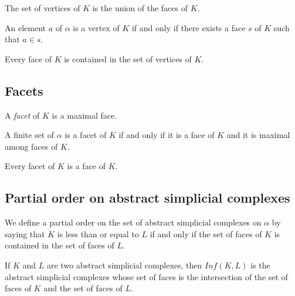 \begin{sublemma}[vertices\_eq]
The set of vertices of $K$ is the union of the faces of $K$.

\end{sublemma}

\begin{sublemma}
An element $a$ of $\alpha$ is a vertex of $K$ if and only if there exists a face $s$ of $K$ such that $a\in s$.

\end{sublemma}

\begin{sublemma}
Every face of $K$ is contained in the set of vertices of $K$.

\end{sublemma}


\subsection{Facets}

\begin{subdefi}[facets]
A \emph{facet} of $K$ is a maximal face.

\end{subdefi}

\begin{sublemma}
A finite set of $\alpha$ is a facet of $K$ if and only if it is a face of $K$ and it is maximal among faces of $K$.

\end{sublemma}

\begin{sublemma}
Every facet of $K$ is a face of $K$.

\end{sublemma}


\subsection{Partial order on abstract simplicial complexes}

\begin{subdefi}
We define a partial order on the set of abstract simplicial complexes on $\alpha$ by saying that $K$ is less than or equal to $L$
if and only if the set of faces of $K$ is contained in the set of faces of $L$.

\end{subdefi}

\begin{subdefi}[Inf]
If $K$ and $L$ are two abstract simplicial complexes, then $Inf(K,L)$ is the abstract simplicial complexes whose set of faces is
the intersection of the set of faces of $K$ and the set of faces of $L$.

\end{subdefi}

